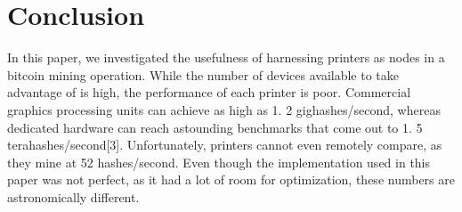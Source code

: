 \section{Conclusion}

In this paper, we investigated the usefulness of harnessing printers as nodes in a bitcoin mining operation.
While the number of devices available to take advantage of is high, the performance of each printer is poor.
Commercial graphics processing units can achieve as high as 1.
2 gighashes/second, whereas dedicated hardware can reach astounding benchmarks that come out to 1.
5 terahashes/second[3].
Unfortunately, printers cannot even remotely compare, as they mine at 52 hashes/second.
Even though the implementation used in this paper was not perfect, as it had a lot of room for optimization, these numbers are astronomically different.
